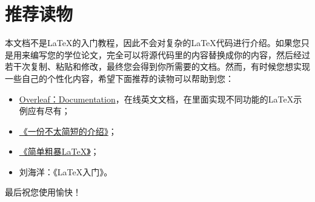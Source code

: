 \section{推荐读物}

本文档不是\LaTeX{}的入门教程，因此不会对复杂的\LaTeX{}代码进行介绍。如果您只是用来编写您的学位论文，完全可以将源代码里的内容替换成你的内容，然后经过若干次复制、粘贴和修改，最终您会得到你所需要的文档。然而，有时候您想实现一些自己的个性化内容，希望下面推荐的读物可以帮助到您：
\begin{itemize}
    \item \href{https://www.overleaf.com/learn}{Overleaf：Documentation}，在线英文文档，在里面实现不同功能的\LaTeX{}示例应有尽有；
    \item \href{http://www.ptep-online.com/ctan/lshort_chinese.pdf}{《一份不太简短的介绍》}；
    \item \href{https://github.com/wklchris/Note-by-LaTeX}{《简单粗暴\LaTeX{}》}；
    \item 刘海洋：《\LaTeX{}入门》\cite{Liu:2013latexrm}。
\end{itemize}
最后祝您使用愉快！